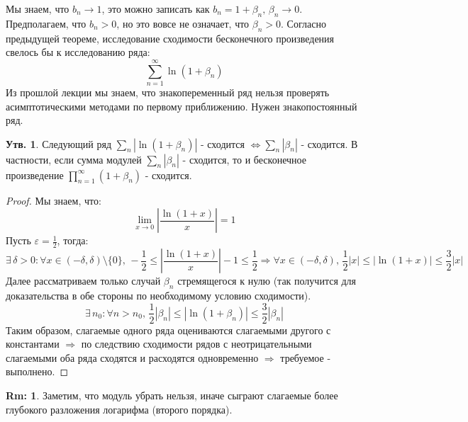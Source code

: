 \documentclass[12pt]{article}
\newcommand{\VE}{\varepsilon}
\theoremstyle{definition}
\newtheorem{rem}{Rm:}
\newtheorem{prop}{Утв.}
\begin{document}
Мы знаем, что $b_n \to 1$, это можно записать как $b_n = 1 + \beta_n, \, \beta_n \to 0$. Предполагаем, что $b_n > 0$, но это вовсе не означает, что $\beta_n > 0$. Согласно предыдущей теореме, исследование сходимости бесконечного произведения свелось бы к исследованию ряда: 
$$
	\displaystyle \sum\limits_{n = 1}^{\infty}\ln(1 + \beta_n)
$$
Из прошлой лекции мы знаем, что знакопеременный ряд нельзя проверять асимптотическими методами по первому приближению. Нужен знакопостоянный ряд.
\begin{prop}
	Следующий ряд $\displaystyle \sum\limits_n \left| \ln(1 + \beta_n) \right|$ - сходится $\Leftrightarrow \displaystyle \sum\limits_n \left| \beta_n \right|$ - сходится. В частности, если сумма модулей $\displaystyle \sum\limits_n \left| \beta_n \right|$ - сходится, то и бесконечное произведение $\displaystyle \prod\limits_{n = 1}^{\infty}(1 + \beta_n)$ - сходится.
\end{prop}
\begin{proof}
	Мы знаем, что:
	$$
		\lim\limits_{x \to 0}\left| \dfrac{\ln(1+x)}{x} \right| =  1
	$$
	Пусть $\VE = \frac{1}{2}$, тогда:
	$$
		\exists \, \delta > 0 \colon \forall x \in (-\delta, \delta) \setminus \{0\}, \, -\dfrac{1}{2} \leq  \left| \dfrac{\ln(1+x)}{x} \right| -1 \leq \dfrac{1}{2} \Rightarrow \forall x \in (-\delta, \delta), \, \dfrac{1}{2} |x| \leq | \ln(1+ x)| \leq \dfrac{3}{2}|x|
	$$
	Далее рассматриваем только случай $\beta_n$ стремящегося к нулю (так получится для доказательства в обе стороны по необходимому условию сходимости).
	$$	
		\exists \, n_0 \colon \forall n > n_0, \, \dfrac{1}{2}|\beta_n| \leq |\ln(1+ \beta_n)| \leq \dfrac{3}{2}|\beta_n|
	$$
	Таким образом, слагаемые одного ряда оцениваются слагаемыми другого с константами $\Rightarrow$ по следствию сходимости рядов с неотрицательными слагаемыми оба ряда сходятся и расходятся одновременно $\Rightarrow$ требуемое - выполнено.
\end{proof}

\begin{rem}
	Заметим, что модуль убрать нельзя, иначе сыграют слагаемые более глубокого разложения логарифма (второго порядка).
\end{rem}
\end{document}
